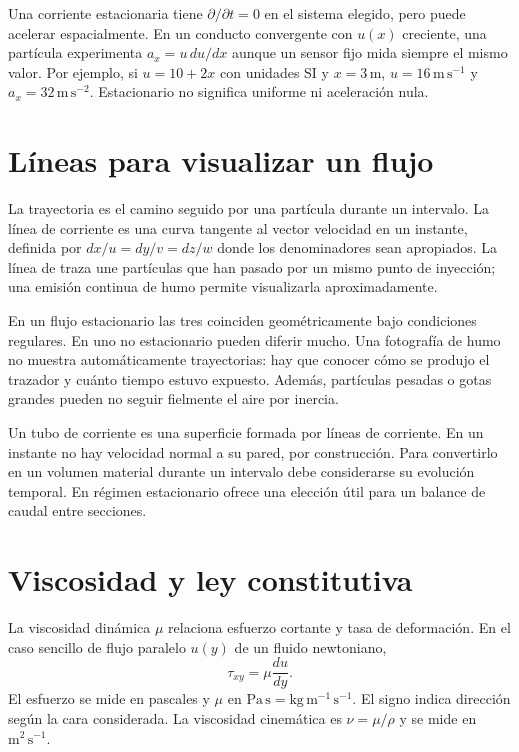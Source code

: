 Una corriente estacionaria tiene $\partial/\partial t=0$ en el sistema elegido, pero puede acelerar espacialmente. En un conducto convergente con $u(x)$ creciente, una partícula experimenta $a_x=u\,du/dx$ aunque un sensor fijo mida siempre el mismo valor. Por ejemplo, si $u=10+2x$ con unidades SI y $x=3\,\mathrm{m}$, $u=16\,\mathrm{m\,s^{-1}}$ y $a_x=32\,\mathrm{m\,s^{-2}}$. Estacionario no significa uniforme ni aceleración nula.

\section{Líneas para visualizar un flujo}
La trayectoria es el camino seguido por una partícula durante un intervalo. La línea de corriente es una curva tangente al vector velocidad en un instante, definida por $dx/u=dy/v=dz/w$ donde los denominadores sean apropiados. La línea de traza une partículas que han pasado por un mismo punto de inyección; una emisión continua de humo permite visualizarla aproximadamente.

En un flujo estacionario las tres coinciden geométricamente bajo condiciones regulares. En uno no estacionario pueden diferir mucho. Una fotografía de humo no muestra automáticamente trayectorias: hay que conocer cómo se produjo el trazador y cuánto tiempo estuvo expuesto. Además, partículas pesadas o gotas grandes pueden no seguir fielmente el aire por inercia.

Un tubo de corriente es una superficie formada por líneas de corriente. En un instante no hay velocidad normal a su pared, por construcción. Para convertirlo en un volumen material durante un intervalo debe considerarse su evolución temporal. En régimen estacionario ofrece una elección útil para un balance de caudal entre secciones.

\section{Viscosidad y ley constitutiva}
La viscosidad dinámica $\mu$ relaciona esfuerzo cortante y tasa de deformación. En el caso sencillo de flujo paralelo $u(y)$ de un fluido newtoniano,
\begin{equation}\label{eq:06-newton}
 \tau_{xy}=\mu\frac{du}{dy}.
\end{equation}
El esfuerzo se mide en pascales y $\mu$ en $\mathrm{Pa\,s}=\mathrm{kg\,m^{-1}\,s^{-1}}$. El signo indica dirección según la cara considerada. La viscosidad cinemática es $\nu=\mu/\rho$ y se mide en $\mathrm{m^2\,s^{-1}}$.

